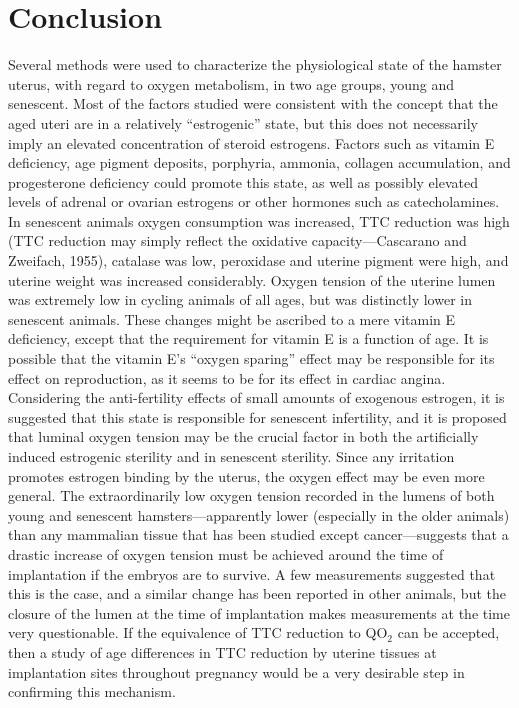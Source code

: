 \chapter{Conclusion}

Several methods were used to characterize the physiological state of the hamster uterus, with regard to oxygen metabolism, in two age groups, young and senescent. Most of the factors studied were consistent with the concept that the aged uteri are in a relatively ``estrogenic'' state, but this does not necessarily imply an elevated concentration of steroid estrogens. Factors such as vitamin E deficiency, age pigment deposits, porphyria, ammonia, collagen accumulation, and progesterone deficiency could promote this state, as well as possibly elevated levels of adrenal or ovarian estrogens or other hormones such as catecholamines. In senescent animals oxygen consumption was increased, TTC reduction was high (TTC reduction may simply reflect the oxidative capacity---Cascarano and Zweifach, 1955), catalase was low, peroxidase and uterine pigment were high, and uterine weight was increased considerably. Oxygen tension of the uterine lumen was extremely low in cycling animals of all ages, but was distinctly lower in senescent animals. These changes might be ascribed to a mere vitamin E deficiency, except that the requirement for vitamin E is a function of age. It is possible that the vitamin E's ``oxygen sparing'' effect may be responsible for its effect on reproduction, as it seems to be for its effect in cardiac angina. Considering the anti-fertility effects of small amounts of exogenous estrogen, it is suggested that this state is responsible for senescent infertility, and it is proposed that luminal oxygen tension may be the crucial factor in both the artificially induced estrogenic sterility and in senescent sterility. Since any irritation promotes estrogen binding by the uterus, the oxygen effect may be even more general. The extraordinarily low oxygen tension recorded in the lumens of both young and senescent hamsters---apparently lower (especially in the older animals) than any mammalian tissue that has been studied except cancer---suggests that a drastic increase of oxygen tension must be achieved around the time of implantation if the embryos are to survive. A few measurements suggested that this is the case, and a similar change has been reported in other animals, but the closure of the lumen at the time of implantation makes measurements at the time very questionable. If the equivalence of TTC reduction to QO$_{2}$ can be accepted, then a study of age differences in TTC reduction by uterine tissues at implantation sites throughout pregnancy would be a very desirable step in confirming this mechanism.